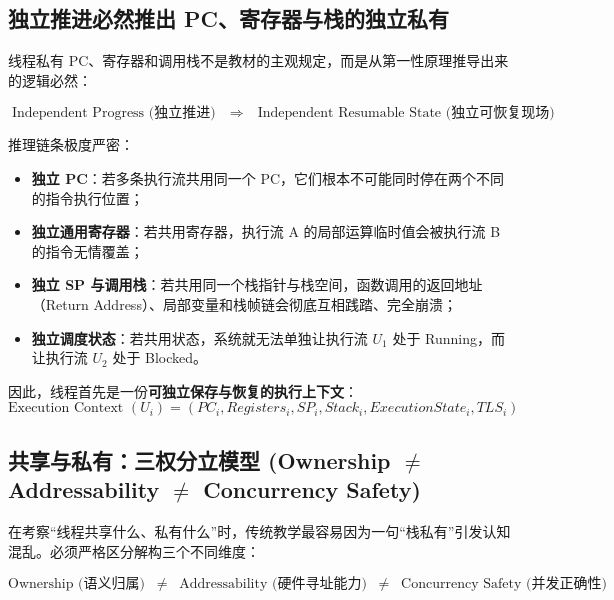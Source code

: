 \documentclass[11pt,a4paper]{ctexart}
\newcommand{\kw}[1]{\textbf{#1}}
\begin{document}
\subsection{独立推进必然推出 PC、寄存器与栈的独立私有}

线程私有 PC、寄存器和调用栈不是教材的主观规定，而是从第一性原理推导出来的逻辑必然：

\[
\boxed{
\text{Independent Progress (独立推进)}
\quad\Longrightarrow\quad
\text{Independent Resumable State (独立可恢复现场)}
}
\]

推理链条极度严密：
\begin{itemize}
\item \kw{独立 PC}：若多条执行流共用同一个 PC，它们根本不可能同时停在两个不同的指令执行位置；
\item \kw{独立通用寄存器}：若共用寄存器，执行流 A 的局部运算临时值会被执行流 B 的指令无情覆盖；
\item \kw{独立 SP 与调用栈}：若共用同一个栈指针与栈空间，函数调用的返回地址（Return Address）、局部变量和栈帧链会彻底互相践踏、完全崩溃；
\item \kw{独立调度状态}：若共用状态，系统就无法单独让执行流 $U_1$ 处于 Running，而让执行流 $U_2$ 处于 Blocked。
\end{itemize}

因此，线程首先是一份\kw{可独立保存与恢复的执行上下文}：
\[
\boxed{
\text{Execution Context } (U_i) = (PC_i, Registers_i, SP_i, Stack_i, ExecutionState_i, TLS_i)
}
\]

\subsection{共享与私有：三权分立模型 \texorpdfstring{(Ownership $\neq$ Addressability $\neq$ Concurrency Safety)}{(Ownership != Addressability != Concurrency Safety)}}

在考察“线程共享什么、私有什么”时，传统教学最容易因为一句“栈私有”引发认知混乱。必须严格区分解构三个不同维度：

\[
\boxed{
\text{Ownership (语义归属)}
\;\;\neq\;\;
\text{Addressability (硬件寻址能力)}
\;\;\neq\;\;
\text{Concurrency Safety (并发正确性)}
}
\]
\end{document}
